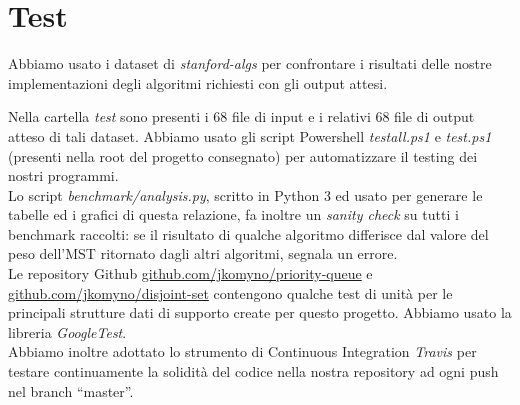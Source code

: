 \section{Test}
\label{cap:tests}

Abbiamo usato i dataset di \textit{stanford-algs} per confrontare i risultati delle nostre implementazioni degli algoritmi richiesti con gli output attesi.

\noindent Nella cartella \textit{test} sono presenti i 68 file di input e i relativi 68 file di output atteso di tali dataset. Abbiamo usato gli script Powershell \textit{testall.ps1} e \textit{test.ps1} (presenti nella root del progetto consegnato) per automatizzare il testing dei nostri programmi. \\

\noindent Lo script \textit{benchmark/analysis.py}, scritto in Python 3 ed usato per generare le tabelle ed i grafici di questa relazione, fa inoltre un \textit{sanity check} su tutti i benchmark raccolti: se il risultato di qualche algoritmo differisce dal valore del peso dell'MST ritornato dagli altri algoritmi, segnala un errore. \\

\noindent Le repository Github \href{https://github.com/jkomyno/priority-queue}{github.com/jkomyno/priority-queue} e \href{https://github.com/jkomyno/disjoint-set}{github.com/jkomyno/disjoint-set} \newline contengono qualche test di unità per le principali strutture dati di supporto create per questo progetto. Abbiamo usato la libreria \textit{GoogleTest}. \\

\noindent Abbiamo inoltre adottato lo strumento di Continuous Integration \textit{Travis} per testare continuamente la solidità del codice nella nostra repository ad ogni push nel branch ``master''.

